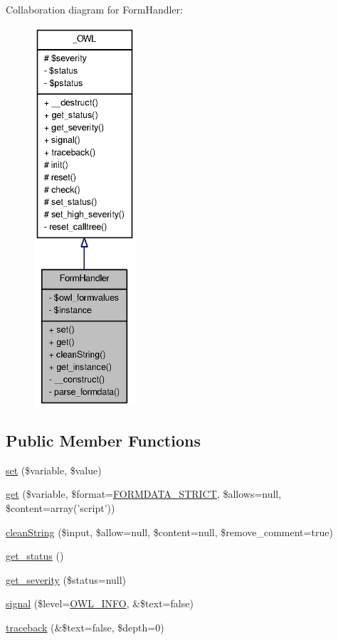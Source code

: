 Collaboration diagram for FormHandler:\nopagebreak
\begin{figure}[H]
\begin{center}
\leavevmode
\includegraphics[height=400pt]{classFormHandler__coll__graph}
\end{center}
\end{figure}
\subsection*{Public Member Functions}
\begin{DoxyCompactItemize}
\item 
\hyperlink{classFormHandler_a5fcc8aef0de87e31ceee65ad1eadb96c}{set} (\$variable, \$value)
\item 
\hyperlink{classFormHandler_a4dbeaa44aa51a795b16379ae703d893a}{get} (\$variable, \$format=\hyperlink{class_8formhandler_8php_af5de9385d7f7fc802eaa8e7090d8e0f5}{FORMDATA\_\-STRICT}, \$allows=null, \$content=array('script'))
\item 
\hyperlink{classFormHandler_a5ee0cda14dcbe0b6e12226db4bd951a0}{cleanString} (\$input, \$allow=null, \$content=null, \$remove\_\-comment=true)
\item 
\hyperlink{class__OWL_a99ec771fa2c5c279f80152cc09e489a8}{get\_\-status} ()
\item 
\hyperlink{class__OWL_adf9509ef96858be7bdd9414c5ef129aa}{get\_\-severity} (\$status=null)
\item 
\hyperlink{class__OWL_a51ba4a16409acf2a2f61f286939091a5}{signal} (\$level=\hyperlink{owl_8severitycodes_8php_a139328861128689f2f4def6a399d9057}{OWL\_\-INFO}, \&\$text=false)
\item 
\hyperlink{class__OWL_aa29547995d6741b7d2b90c1d4ea99a13}{traceback} (\&\$text=false, \$depth=0)
\end{DoxyCompactItemize}
